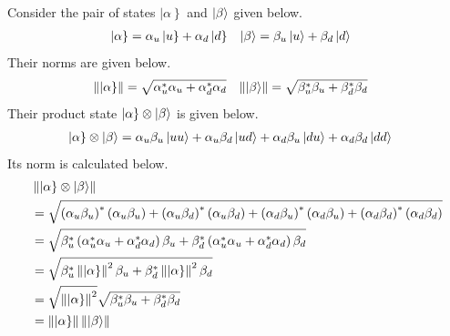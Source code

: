 Consider the pair of states $\left|\alpha\right\}$ and $\ket{\beta}$ given below.
\begin{align}\label{eqn:states}
	\left|\alpha\right\} & = \alpha_u \left|u\right\} + \alpha_d \left|d\right\}
	                     &
	\ket{\beta}          & = \beta_u \ket{u} + \beta_d \ket{d}
\end{align}
Their norms are given below.
\begin{align}\label{eqn:norm}
	\left\||\alpha\}\right\|   & = \sqrt{\alpha_u^* \alpha_u + \alpha_d^* \alpha_d}
	                           &
	\left\|\ket{\beta}\right\| & = \sqrt{\beta_u^* \beta_u + \beta_d^* \beta_d}
\end{align}
Their product state $\left|\alpha\right\} \otimes \ket{\beta}$
is given below.
\begin{align}\label{eqn:product}
	\left|\alpha\right\} \otimes \ket{\beta} & = \alpha_u \beta_u \ket{u u} + \alpha_u \beta_d \ket{u d} + \alpha_d \beta_u \ket{d u} + \alpha_d \beta_d \ket{d d}
\end{align}
Its norm is calculated below.
\begin{align}\label{eqn:pnorm}
	 & \left\||\alpha\} \otimes \ket{\beta}\right\| \nonumber                                                                                                                                                                                                                           \\
	 & = \sqrt{\left(\alpha_u \beta_u\right)^* \left(\alpha_u \beta_u\right) + \left(\alpha_u \beta_d\right)^* \left(\alpha_u \beta_d\right) + \left(\alpha_d \beta_u\right)^* \left(\alpha_d \beta_u\right) + \left(\alpha_d \beta_d\right)^* \left(\alpha_d \beta_d\right)} \nonumber \\
	 & = \sqrt{\beta_u^* \left(\alpha_u^* \alpha_u + \alpha_d^* \alpha_d \right) \beta_u + \beta_d^* \left(\alpha_u^* \alpha_u + \alpha_d^* \alpha_d\right)\beta_d} \nonumber                                                                                                           \\
	 & = \sqrt{\beta_u^* \left\||\alpha\}\right\|^2 \beta_u + \beta_d^* \left\||\alpha\}\right\|^2 \beta_d} \nonumber                                                                                                                                                                   \\
	 & = \sqrt{\left\||\alpha\}\right\|^2} \sqrt{\beta_u^* \beta_u + \beta_d^* \beta_d} \nonumber                                                                                                                                                                                       \\
	 & = \left\||\alpha\}\right\| \left\|\ket{\beta}\right\|
\end{align}

